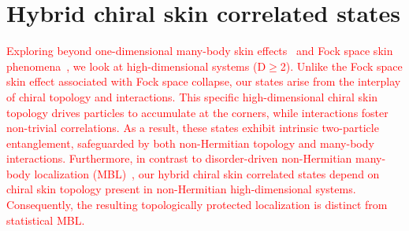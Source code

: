 \documentclass[longbibliography, aps, prx, amsmath, amssymb, amsfonts, twocolumn,superscriptaddress, footinbib]{revtex4-1}
\begin{document}
	\section{Hybrid chiral skin correlated states}

	\textcolor{red}{
		Exploring beyond one-dimensional many-body skin effects~\cite{shen2025observation} and Fock space skin phenomena~\cite{shen2024enhanced,shimomura2024general}, we look at high-dimensional systems (D$\geq$2). Unlike the Fock space skin effect associated with Fock space collapse, our states arise from the interplay of chiral topology and interactions. This specific high-dimensional chiral skin topology drives particles to accumulate at the corners, while interactions foster non-trivial correlations. As a result, these states exhibit intrinsic two-particle entanglement, safeguarded by both non-Hermitian topology and many-body interactions. Furthermore, in contrast to disorder-driven non-Hermitian many-body localization (MBL)~\cite{mak2024statics,hamazaki2019non}, our hybrid chiral skin correlated states depend on chiral skin topology present in non-Hermitian high-dimensional systems. Consequently, the resulting topologically protected localization is distinct from statistical MBL.
	}
\end{document}
